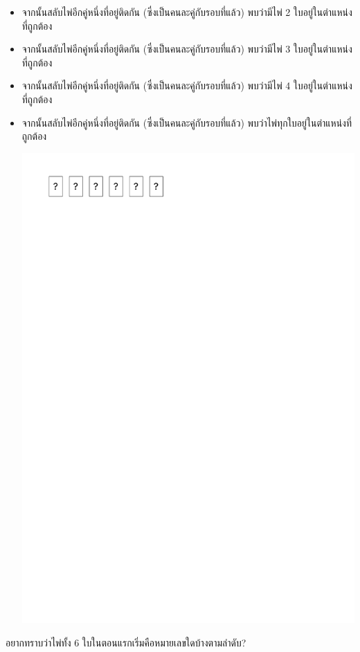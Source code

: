 \begin{itemize}[topsep=0pc,itemsep=0pc]
\item  จากนั้นสลับไพ่อีกคู่หนึ่งที่อยู่ติดกัน (ซึ่งเป็นคนละคู่กับรอบที่แล้ว) \; พบว่ามีไพ่ 2 ใบอยู่ในตำแหน่งที่ถูกต้อง
\item  จากนั้นสลับไพ่อีกคู่หนึ่งที่อยู่ติดกัน (ซึ่งเป็นคนละคู่กับรอบที่แล้ว) \; พบว่ามีไพ่ 3 ใบอยู่ในตำแหน่งที่ถูกต้อง
\item  จากนั้นสลับไพ่อีกคู่หนึ่งที่อยู่ติดกัน (ซึ่งเป็นคนละคู่กับรอบที่แล้ว) \; พบว่ามีไพ่ 4 ใบอยู่ในตำแหน่งที่ถูกต้อง
\item  จากนั้นสลับไพ่อีกคู่หนึ่งที่อยู่ติดกัน (ซึ่งเป็นคนละคู่กับรอบที่แล้ว) \; พบว่าไพ่ทุกใบอยู่ในตำแหน่งที่ถูกต้อง
    \begin{center}
        \includegraphics[page=2]{figures/puzzle.pdf}
    \end{center}
\end{itemize}
อยากทราบว่าไพ่ทั้ง 6 ใบในตอนแรกเริ่มคือหมายเลขใดบ้างตามลำดับ?


